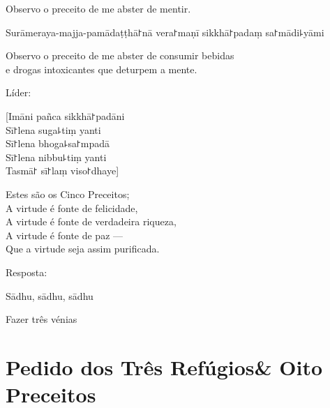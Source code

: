 \enlargethispage{\baselineskip}

\begin{english}
  Observo o preceito de me abster de mentir.
\end{english}

\clearpage

\begin{precept}
  \setcounter{enumi}{4}
  \item Surāmeraya-majja-pamādaṭṭhā꜓nā vera꜓maṇī sikkhā꜓padaṃ sa꜓mādi꜕yāmi
\end{precept}

\begin{english}
  Observo o preceito de me abster de consumir bebidas\\
  e drogas intoxicantes que deturpem a mente.
\end{english}

\begin{instruction}
  Líder:
\end{instruction}

[Imāni pañca sikkhā꜓padāni\\
Sī꜓lena suga꜕tiṃ yanti\\
Sī꜓lena bhoga꜕sa꜓mpadā\\
Sī꜓lena nibbu꜕tiṃ yanti\\
Tasmā꜓ sī꜓laṃ viso꜓dhaye]

\begin{english}
  Estes são os Cinco Preceitos;\\
  A virtude é fonte de felicidade,\\
  A virtude é fonte de verdadeira riqueza,\\
  A virtude é fonte de paz ---\\
  Que a virtude seja assim purificada.
\end{english}

\begin{instruction}
  Resposta:
\end{instruction}

Sādhu, sādhu, sādhu

\begin{instruction}
  Fazer três vénias
\end{instruction}

\clearpage
\chapter[Três Refúgios \& Oito Preceitos]{Pedido dos Três Refúgios\newline \& Oito Preceitos}


